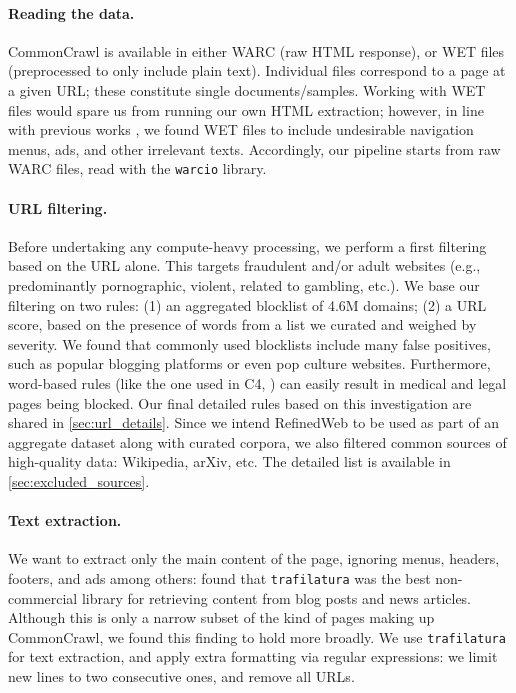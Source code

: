\paragraph{Reading the data.} CommonCrawl is available in either WARC (raw HTML response), or WET files (preprocessed to only include plain text). Individual files correspond to a page at a given URL; these constitute single documents/samples. Working with WET files would spare us from running our own HTML extraction; however, in line with previous works \cite{gao2020pile, gopher}, we found WET files to include undesirable navigation menus, ads, and other irrelevant texts. Accordingly, our pipeline starts from raw WARC files, read with the \texttt{warcio} library. 

\paragraph{URL filtering.} \label{sec:URLFiltering} Before undertaking any compute-heavy processing, we perform a first filtering based on the URL alone. This targets fraudulent and/or adult websites (e.g., predominantly pornographic, violent, related to gambling, etc.). We base our filtering on two rules: (1) an aggregated blocklist of 4.6M domains; (2) a URL score, based on the presence of words from a list we curated and weighed by severity. We found that commonly used blocklists include many false positives, such as popular blogging platforms or even pop culture websites. Furthermore, word-based rules (like the one used in C4, \citet{2020t5}) can easily result in medical and legal pages being blocked. Our final detailed rules based on this investigation are shared in \ref{sec:url_details}. Since we intend RefinedWeb to be used as part of an aggregate dataset along with curated corpora, we also filtered common sources of high-quality data: Wikipedia, arXiv, etc. The detailed list is available in \ref{sec:excluded_sources}.

\paragraph{Text extraction.} We want to extract only the main content of the page, ignoring menus, headers, footers, and ads among others: \citet{lopukhin2019} found that \texttt{trafilatura} \cite{barbaresi-2021-trafilatura} was the best non-commercial library for retrieving content from blog posts and news articles. Although this is only a narrow subset of the kind of pages making up CommonCrawl, we found this finding to hold more broadly. We  use \texttt{trafilatura} for text extraction, and apply extra formatting via regular expressions: we limit new lines to two consecutive ones, and remove all URLs. 


